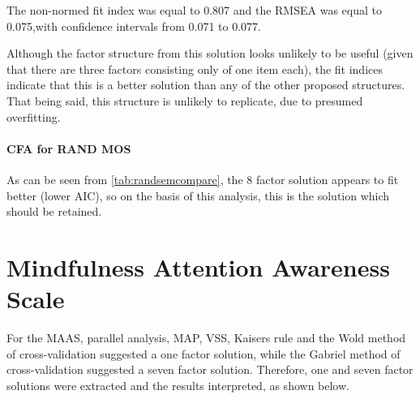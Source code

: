 \documentclass{article}
\begin{document}
The non-normed fit index was equal to 0.807
and the RMSEA was equal to 0.075,with confidence intervals from 0.071 to 0.077. 

Although the factor structure from this solution looks unlikely to be useful (given that there are three factors consisting only of one item each), the fit indices indicate that this is a better solution than any of the other proposed structures. That being said, this structure is unlikely to replicate, due to presumed overfitting. 


\paragraph{CFA for RAND MOS}






\begin{table}[ht]
\centering
{}
\caption{SEM Comparison for RAND MOS Factor Solutions, Sample One} 
\label{tab:randsemcompare}
\end{table}
As can be seen from \ref{tab:randsemcompare}, the 8 factor solution appears to fit better (lower AIC), so on the basis of this analysis, this is the solution which should be retained.

\section{Mindfulness Attention Awareness Scale}

For the MAAS, parallel analysis, MAP, VSS, Kaisers rule and the Wold method of cross-validation suggested a one factor solution, while the Gabriel method of cross-validation suggested a seven factor solution.  Therefore, one and seven factor solutions were extracted and the results interpreted, as shown below.
\end{document}
